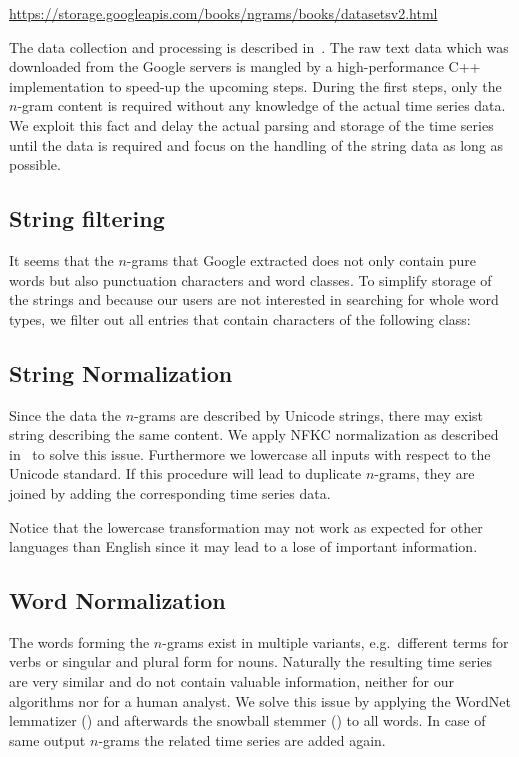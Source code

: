 \url{https://storage.googleapis.com/books/ngrams/books/datasetsv2.html}

The data collection and processing is described in~\cite{Google_nGrams}. The raw text data which was downloaded from the Google servers is mangled by a high-performance C++ implementation to speed-up the upcoming steps. During the first steps, only the $n$-gram content is required without any knowledge of the actual time series data. We exploit this fact and delay the actual parsing and storage of the time series until the data is required and focus on the handling of the string data as long as possible.


\subsection{String filtering}
\label{ssec:baseline:data:filter}
It seems that the $n$-grams that Google extracted does not only contain pure words but also punctuation characters and word classes. To simplify storage of the strings and because our users are not interested in searching for whole word types, we filter out all entries that contain characters of the following class:

\code{\[\_.\slash{},:;!?\textbackslash'"\#()<>=+*\{\}0-9\]}

\subsection{String Normalization}
\label{ssec:baseline:data:snorm}
Since the data the $n$-grams are described by Unicode strings, there may exist string describing the same content. We apply NFKC normalization as described in~\cite{unicode8annex15} to solve this issue. Furthermore we lowercase all inputs with respect to the Unicode standard. If this procedure will lead to duplicate $n$-grams, they are joined by adding the corresponding time series data.

Notice that the lowercase transformation may not work as expected for other languages than English since it may lead to a lose of important information.


\subsection{Word Normalization}
\label{ssec:baseline:data:wnorm}
The words forming the $n$-grams exist in multiple variants, e.g.\ different terms for verbs or singular and plural form for nouns. Naturally the resulting time series are very similar and do not contain valuable information, neither for our algorithms nor for a human analyst. We solve this issue by applying the WordNet lemmatizer (\cite{wordnet}) and afterwards the snowball stemmer (\cite{porter2}) to all words. In case of same output $n$-grams the related time series are added again.

